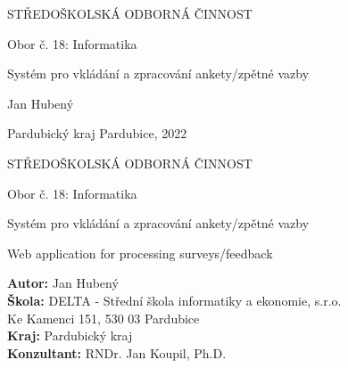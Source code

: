 \begin{titlepage}
    \bfseries{
        \begin{center}
            \LARGE{STŘEDOŠKOLSKÁ ODBORNÁ ČINNOST}

            \vspace{14pt}
            \large{
                Obor č. 18: Informatika
            }

            \vspace{0.4 \textheight}

            \LARGE{
			Systém pro vkládání a zpracování ankety/zpětné vazby
            }

            \vspace{0.3\textheight}
        \end{center}
        
        \noindent\Large{Jan Hubený}

        \noindent\Large{Pardubický kraj   Pardubice, 2022}
        
            
    }
\end{titlepage}

\cleardoublepage

{\bfseries
    \begin{center}
        \LARGE{STŘEDOŠKOLSKÁ ODBORNÁ ČINNOST}

        \vspace{14pt}
        {\large
            Obor č. 18: Informatika
        }

        \vspace{0.25 \textheight}

        \LARGE{
        	Systém pro vkládání a zpracování ankety/zpětné vazby
        }
    
    	\vspace{20pt}
    	
    	\LARGE{
    		Web application for processing surveys/feedback
    	}


        \vspace{0.22\textheight}
    \end{center}  
}
{\Large
    \noindent\textbf{Autor:} Jan Hubený\\
    \textbf{Škola:} DELTA - Střední škola informatiky a ekonomie, s.r.o.\\Ke Kamenci 151, 530 03 Pardubice\\
    \textbf{Kraj:} Pardubický kraj\\
    \textbf{Konzultant:} RNDr. Jan Koupil, Ph.D.\\
}

